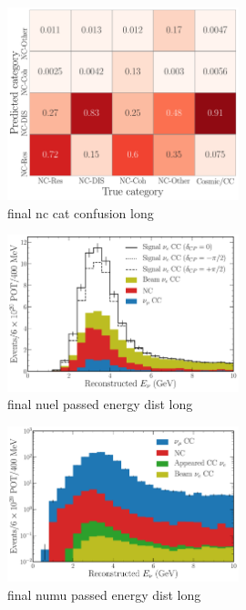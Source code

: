 \begin{figure} %
    \includegraphics[width=0.6\textwidth]{diagrams/6-cvn/chipsnet/final_nc_cat_confusion.pdf}
    \caption[final nc cat confusion short]
    {final nc cat confusion long}
    \label{fig:final_nc_cat_confusion}
\end{figure}

\begin{figure} %
    \includegraphics[width=0.6\textwidth]{diagrams/6-cvn/chipsnet/final_nuel_passed_energy_dist.pdf}
    \caption[final nuel passed energy dist short]
    {final nuel passed energy dist long}
    \label{fig:final_nuel_passed_energy_dist}
\end{figure}

\begin{figure} %
    \includegraphics[width=0.6\textwidth]{diagrams/6-cvn/chipsnet/final_numu_passed_energy_dist.pdf}
    \caption[final numu passed energy dist short]
    {final numu passed energy dist long}
    \label{fig:final_numu_passed_energy_dist}
\end{figure}

